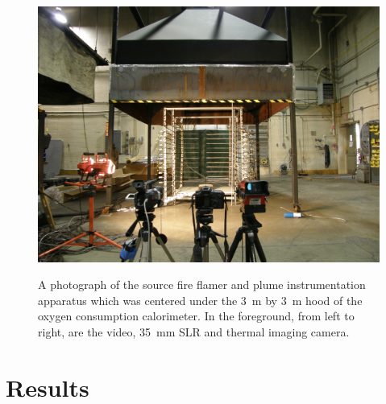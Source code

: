 \documentclass[twoside]{uocthesis}
\begin{document}
\begin{figure}
  \centering
  \includegraphics[width=\textwidth]{../Figures/Source_Fire_Flamer}\\
  \caption[A photograph of the source fire flamer and plume instrumentation apparatus]{A photograph of the source fire flamer and plume instrumentation apparatus which was centered under the 3~m by 3~m hood of the oxygen consumption calorimeter.  In the foreground, from left to right, are the video, 35~mm SLR and thermal imaging camera.}
  \label{Fire_Flamer}
\end{figure}



\chapter{Results}
\end{document}
